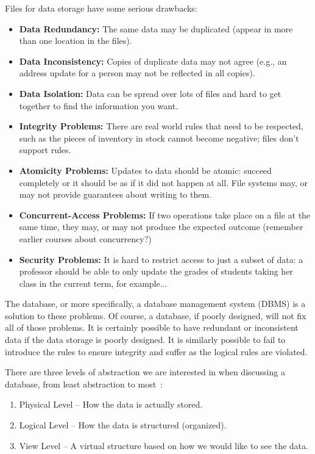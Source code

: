 \documentclass[a4paper]{report}
\begin{document}
Files for data storage have some serious drawbacks:
\begin{itemize}
	\item \textbf{Data Redundancy:} The same data may be duplicated (appear in more than one location in the files).
	\item \textbf{Data Inconsistency:} Copies of duplicate data may not agree (e.g., an address update for a person may not be reflected in all copies).
	\item \textbf{Data Isolation:} Data can be spread over lots of files and hard to get together to find the information you want.
	\item \textbf{Integrity Problems:} There are real world rules that need to be respected, such as the pieces of inventory in stock cannot become negative; files don't support rules.
	\item \textbf{Atomicity Problems:} Updates to data should be atomic: succeed completely or it should be as if it did not happen at all. File systems may, or may not provide guarantees about writing to them.
	\item \textbf{Concurrent-Access Problems:} If two operations take place on a file at the same time, they may, or may not produce the expected outcome (remember earlier courses about concurrency?)
	\item \textbf{Security Problems:} It is hard to restrict access to just a subset of data: a professor should be able to only update the grades of students taking her class in the current term, for example...
\end{itemize}

The database, or more specifically, a database management system (DBMS) is a solution to these problems. Of course, a database, if poorly designed, will not fix all of those problems. It is certainly possible to have redundant or inconsistent data if the data storage is poorly designed. It is similarly possible to fail to introduce the rules to ensure integrity and suffer as the logical rules are violated. 

There are three levels of abstraction we are interested in when discussing a database, from least abstraction to most~\cite{dsc}:

\begin{enumerate}
	\item Physical Level -- How the data is actually stored.
	\item Logical Level -- How the data is structured (organized).
	\item View Level -- A virtual structure based on how we would like to see the data. 
\end{enumerate}
\end{document}
